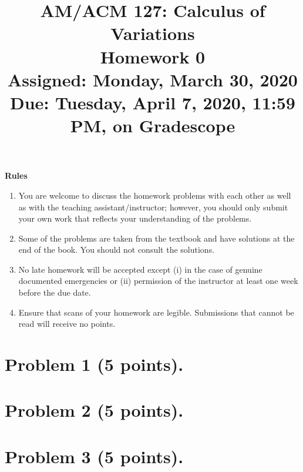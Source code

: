 \documentclass[]{article}
\title{AM/ACM 127: Calculus of Variations\\ \large{Homework 0} \\ \large{Assigned: Monday, March 30, 2020} \\ \large{\textbf{Due: Tuesday, April 7, 2020, 11:59 PM, on Gradescope}}}
\author{ 
	     }
\date{}
\theoremstyle{standard}\newtheorem{definition}{Definition}[section]\newtheorem*{definition*}{Definition}
\theoremstyle{standard}\newtheorem{remark}{Remark}[section]\newtheorem*{remark*}{Remark}
\theoremstyle{standard}\newtheorem{result}{Result}[section]\newtheorem*{result*}{Result}
\theoremstyle{standard}\newtheorem{example}{Example}[section]\newtheorem*{example*}{Example}
\theoremstyle{standard}\newtheorem{problem}{Problem}[section]\newtheorem*{problem*}{Problem}
\numberwithin{equation}{section} %
\begin{document}
\maketitle
\textbf{Rules}
\begin{enumerate}
\item You are welcome to discuss the homework problems with each other as well as with the teaching assistant/instructor; however, you should only submit your own work that reflects your understanding of the problems.
\item Some of the problems are taken from the textbook and have solutions at the end of the book. You should not consult the solutions.
\item No late homework will be accepted except (i) in the case of genuine documented emergencies or (ii) permission of the instructor at least one week before the due date.
\item Ensure that scans of your homework are legible. Submissions that cannot be read will receive no points.
\end{enumerate}
\newpage

\section*{Problem 1 (5 points).}



\noindent
\hrulefill

\section*{Problem 2 (5 points).}



\noindent
\hrulefill


\section*{Problem 3 (5 points).}


\noindent
\hrulefill
\end{document}
